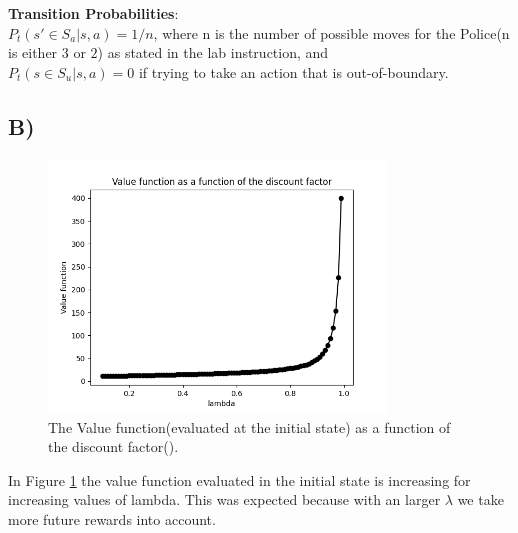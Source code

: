\documentclass{article}
\begin{document}
\textbf{Transition Probabilities}:\\
$P_t(s' \in S_a |s,a) = 1/n$, where n is the number of possible moves for the Police(n is either $3$ or $2$) as stated in the lab instruction, and \\$P_t(s \in S_u |s,a) = 0$ if trying to take an action that is out-of-boundary. 

        


\subsection*{B)}

\begin{figure}[H]
    \centering
    \includegraphics[width=0.8\textwidth]{Lab_1/images/problem_2/valueFunction.png}
    \caption{\small The Value function(evaluated at the initial state) as a function of the discount factor(\lambda). }
    \label{fig:Valfunc}
\end{figure}




\noindent 
In Figure \ref{fig:Valfunc} the value function evaluated in the initial state is increasing for increasing values of lambda. This was expected because with an larger $\lambda$ we take more future rewards into account.   
\end{document}
